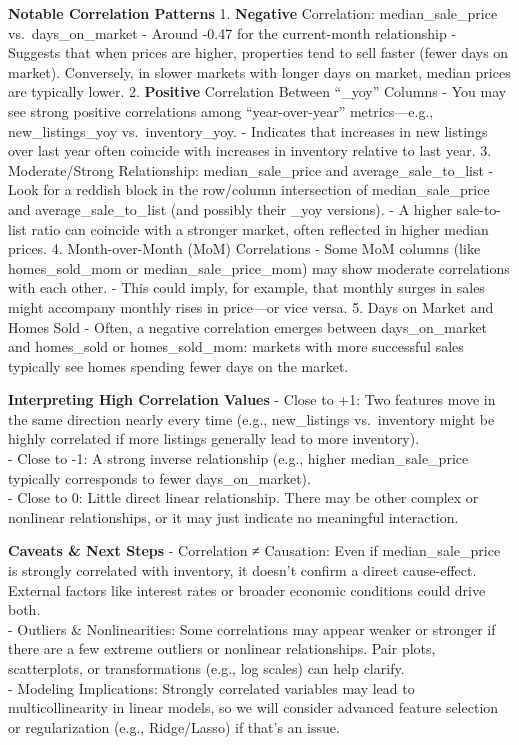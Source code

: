 \documentclass[11pt]{article}
\begin{document}
\textbf{Notable Correlation Patterns} 1. \textbf{Negative} Correlation:
median\_sale\_price vs.~days\_on\_market - Around -0.47 for the
current-month relationship - Suggests that when prices are higher,
properties tend to sell faster (fewer days on market). Conversely, in
slower markets with longer days on market, median prices are typically
lower. 2. \textbf{Positive} Correlation Between ``\_yoy'' Columns - You
may see strong positive correlations among ``year-over-year''
metrics---e.g., new\_listings\_yoy vs.~inventory\_yoy. - Indicates that
increases in new listings over last year often coincide with increases
in inventory relative to last year. 3. Moderate/Strong Relationship:
median\_sale\_price and average\_sale\_to\_list - Look for a reddish
block in the row/column intersection of median\_sale\_price and
average\_sale\_to\_list (and possibly their \_yoy versions). - A higher
sale-to-list ratio can coincide with a stronger market, often reflected
in higher median prices. 4. Month-over-Month (MoM) Correlations - Some
MoM columns (like homes\_sold\_mom or median\_sale\_price\_mom) may show
moderate correlations with each other. - This could imply, for example,
that monthly surges in sales might accompany monthly rises in price---or
vice versa. 5. Days on Market and Homes Sold - Often, a negative
correlation emerges between days\_on\_market and homes\_sold or
homes\_sold\_mom: markets with more successful sales typically see homes
spending fewer days on the market.

\textbf{Interpreting High Correlation Values} - Close to +1: Two
features move in the same direction nearly every time (e.g.,
new\_listings vs.~inventory might be highly correlated if more listings
generally lead to more inventory).\\
- Close to -1: A strong inverse relationship (e.g., higher
median\_sale\_price typically corresponds to fewer days\_on\_market).\\
- Close to 0: Little direct linear relationship. There may be other
complex or nonlinear relationships, or it may just indicate no
meaningful interaction.

\textbf{Caveats \& Next Steps} - Correlation ≠ Causation: Even if
median\_sale\_price is strongly correlated with inventory, it doesn't
confirm a direct cause-effect. External factors like interest rates or
broader economic conditions could drive both.\\
- Outliers \& Nonlinearities: Some correlations may appear weaker or
stronger if there are a few extreme outliers or nonlinear relationships.
Pair plots, scatterplots, or transformations (e.g., log scales) can help
clarify.\\
- Modeling Implications: Strongly correlated variables may lead to
multicollinearity in linear models, so we will consider advanced feature
selection or regularization (e.g., Ridge/Lasso) if that's an issue.
\end{document}
